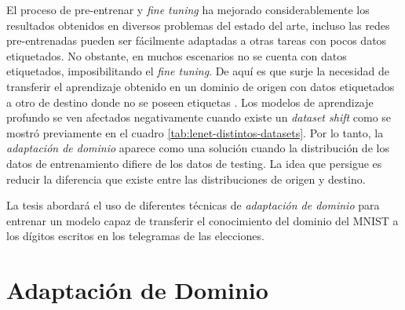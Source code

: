 El proceso de pre-entrenar y {\it fine tuning} ha mejorado considerablemente los resultados obtenidos en diversos
problemas del estado del arte, incluso las redes pre-entrenadas pueden ser f\'acilmente adaptadas a otras tareas con
pocos datos etiquetados. No obstante, en muchos escenarios no se cuenta con datos etiquetados, imposibilitando el {\it
        fine tuning}. De aqu\'i es que surje la necesidad de transferir el aprendizaje obtenido en un dominio de origen con
datos etiquetados a otro de destino donde no se poseen etiquetas \parencite{ben2006analysis}. Los modelos de aprendizaje profundo se ven afectados negativamente cuando existe un {\it
        dataset shift} como se mostr\'o previamente en el cuadro \ref{tab:lenet-distintos-datasets}. Por lo tanto, la {\it
        adaptaci\'on de dominio} aparece como una soluci\'on cuando la distribuci\'on de los datos de entrenamiento difiere de
los datos de testing. La idea que persigue es reducir la diferencia que existe entre las distribuciones de origen y
destino.

La tesis abordar\'a el uso de diferentes t\'ecnicas de {\it adaptaci\'on de dominio} para entrenar un modelo capaz de
transferir el conocimiento del dominio del MNIST a los d\'igitos escritos en los telegramas de las elecciones.

\section{Adaptaci\'on de Dominio}

\lipsum[1]